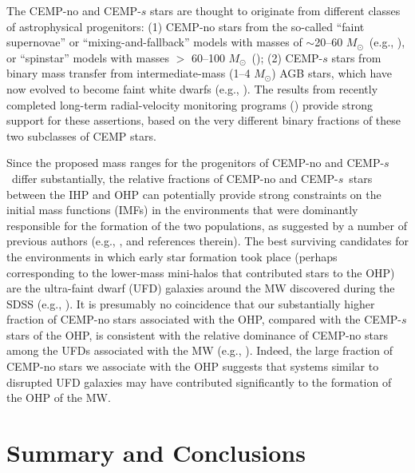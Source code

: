 \documentclass[iop]{emulateapj}
\newcommand*{\msun}{$M_\odot$}
\newcommand*{\cemps}{CEMP-$s$}
\begin{document}
The CEMP-no and CEMP-$s$ stars are thought to originate
from different classes of astrophysical progenitors: (1) CEMP-no stars 
from the so-called ``faint supernovae'' or ``mixing-and-fallback'' models
with masses of $\sim$20--60 \msun\ (e.g., \citealt{umeda2003,
umeda2005, nomoto2013, tominaga2014}), or ``spinstar'' models with masses
$>$ 60--100 \msun\ (\citealt{meynet2006, meynet2010, chiappini2013}); 
(2) CEMP-$s$ stars from binary mass transfer from intermediate-mass
(1--4 \msun) AGB stars, which have now evolved to become faint white
dwarfs (e.g., \citealt{suda2004, herwig2005, lucatello2005, komiya2007,
bisterzo2011, hansen2015}). The results from recently completed
long-term radial-velocity monitoring programs (\citealt{starkenburg2014,
hansen2016a, hansen2016b, jorissen2016}) provide strong support for
these assertions, based on the very different binary fractions of 
these two subclasses of CEMP stars.

Since the proposed mass ranges for the progenitors of CEMP-no and
\cemps\ differ substantially, the relative fractions of CEMP-no and \cemps\
stars between the IHP and OHP can potentially provide strong constraints on the
initial mass functions (IMFs) in the environments that were dominantly
responsible for the formation of the two populations, as suggested by a
number of previous authors (e.g., \citealt{carollo2014, lee2014}, and
references therein). The best surviving candidates for the environments
in which early star formation took place (perhaps corresponding to the
lower-mass mini-halos that contributed stars to the OHP) are the
ultra-faint dwarf (UFD) galaxies around the MW discovered during the
SDSS (e.g., \citealt{belokurov2006a, belokurov2006b, zucker2006}). It is
presumably no coincidence that our substantially higher fraction of
CEMP-no stars associated with the OHP, compared with the CEMP-$s$ stars
of the OHP, is consistent with the relative dominance of CEMP-no stars
among the UFDs associated with the MW (e.g., \citealt{frebel2014}). Indeed,
the large fraction of CEMP-no stars we
associate with the OHP suggests that systems similar to disrupted UFD
galaxies may have contributed significantly to the formation of the
OHP of the MW.

\section{Summary and Conclusions}
\end{document}
